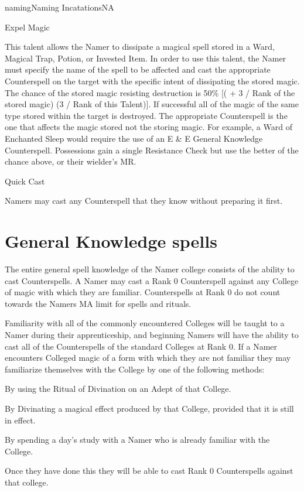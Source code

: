 \begin{College}[2.0]{naming}{Naming Incatations}{NA}
\begin{talent}[T-2]{Expel Magic}
\begin{effects}
This talent allows the Namer to dissipate a magical spell stored in a
Ward, Magical Trap, Potion, or Invested Item. In order to use this
talent, the Namer must specify the name of the spell to be affected
and cast the appropriate Counterspell on the target with the specific
intent of dissipating the stored magic.  The chance of the stored
magic resisting destruction is 50\% [( + 3 / Rank of the stored magic)
  (3 / Rank of this Talent)].  If successful all of the magic of the
same type stored within the target is destroyed.  The appropriate
Counterspell is the one that affects the magic stored not the storing
magic.  For example, a Ward of Enchanted Sleep would require the use
of an E \& E General Knowledge Counterspell. Possessions gain a single
Resistance Check but use the better of the chance above, or their
wielder’s MR.
\end{effects}
\end{talent}

\begin{talent}[T-3]{Quick Cast}

\begin{effects}
Namers may cast any Counterspell that they know without preparing it
first.
\end{effects}
\end{talent}

\section{General Knowledge spells}

The entire general spell knowledge of the Namer college consists of
the ability to cast Counterspells.  A Namer may cast a Rank 0
Counterspell against any College of magic with which they are
familiar.  Counterspells at Rank 0 do not count towards the Namers MA
limit for spells and rituals.

Familiarity with all of the commonly encountered Colleges will be
taught to a Namer during their apprenticeship, and beginning Namers
will have the ability to cast all of the Counterspells of the standard
Colleges at Rank 0. If a Namer encounters Colleged magic of a form
with which they are not familiar they may familiarize themselves with
the College by one of the following methods:
\begin{Itemize}
\item By using the Ritual of Divination on an Adept of that College.
\item By Divinating a magical effect produced by that College,
  provided that it is still in effect.
\item By spending a day’s study with a Namer who is already familiar
  with the College.
\end{Itemize}
Once they have done this they will be able to cast Rank 0
Counterspells against that college.


\end{College}
